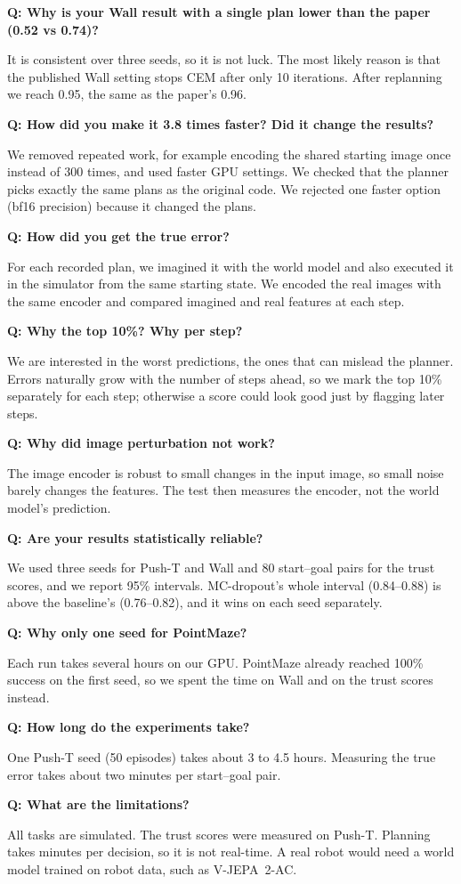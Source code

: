 \documentclass[11pt,a4paper]{article}
\newcommand{\Q}[1]{\par\medskip\noindent\textbf{\color{accent}Q: #1}\par\nopagebreak}
\newcommand{\A}{\noindent}
\begin{document}
\Q{Why is your Wall result with a single plan lower than the paper (0.52 vs 0.74)?}
\A It is consistent over three seeds, so it is not luck. The most likely reason is that the published Wall setting
stops CEM after only 10 iterations. After replanning we reach 0.95, the same as the paper's 0.96.

\Q{How did you make it 3.8 times faster? Did it change the results?}
\A We removed repeated work, for example encoding the shared starting image once instead of 300 times, and used faster
GPU settings. We checked that the planner picks exactly the same plans as the original code. We rejected one faster
option (bf16 precision) because it changed the plans.

\Q{How did you get the true error?}
\A For each recorded plan, we imagined it with the world model and also executed it in the simulator from the same
starting state. We encoded the real images with the same encoder and compared imagined and real features at each step.

\Q{Why the top 10\%? Why per step?}
\A We are interested in the worst predictions, the ones that can mislead the planner. Errors naturally grow with the
number of steps ahead, so we mark the top 10\% separately for each step; otherwise a score could look good just by
flagging later steps.

\Q{Why did image perturbation not work?}
\A The image encoder is robust to small changes in the input image, so small noise barely changes the features. The
test then measures the encoder, not the world model's prediction.

\Q{Are your results statistically reliable?}
\A We used three seeds for Push-T and Wall and 80 start--goal pairs for the trust scores, and we report 95\% intervals.
MC-dropout's whole interval (0.84--0.88) is above the baseline's (0.76--0.82), and it wins on each seed separately.

\Q{Why only one seed for PointMaze?}
\A Each run takes several hours on our GPU. PointMaze already reached 100\% success on the first seed, so we spent the
time on Wall and on the trust scores instead.

\Q{How long do the experiments take?}
\A One Push-T seed (50 episodes) takes about 3 to 4.5 hours. Measuring the true error takes about two minutes per
start--goal pair.

\Q{What are the limitations?}
\A All tasks are simulated. The trust scores were measured on Push-T. Planning takes minutes per decision, so it is not
real-time. A real robot would need a world model trained on robot data, such as V-JEPA~2-AC.
\end{document}
